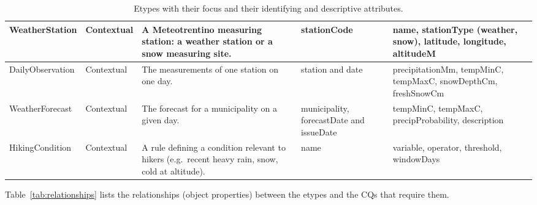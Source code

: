 \begin{table}[htbp]
\begin{tabular}{|>{\raggedright\arraybackslash}p{2.5cm}|>{\raggedright\arraybackslash}p{1.6cm}|>{\raggedright\arraybackslash}p{3.9cm}|>{\raggedright\arraybackslash}p{2.9cm}|>{\raggedright\arraybackslash}p{4.0cm}|}
WeatherStation & Contextual & A Meteotrentino measuring station: a weather station or a snow measuring site. & stationCode & name, stationType (weather, snow), latitude, longitude, altitudeM \\ \hline
DailyObservation & Contextual & The measurements of one station on one day. & station and date & precipitationMm, tempMinC, tempMaxC, snowDepthCm, freshSnowCm \\ \hline
WeatherForecast & Contextual & The forecast for a municipality on a given day. & municipality, forecastDate and issueDate & tempMinC, tempMaxC, precipProbability, description \\ \hline
HikingCondition & Contextual & A rule defining a condition relevant to hikers (e.g.\ recent heavy rain, snow, cold at altitude). & name & variable, operator, threshold, windowDays \\ \hline
\end{tabular}
\caption{Etypes with their focus and their identifying and descriptive attributes.}
\label{tab:etypes}
\end{table}

\noindent Table~\ref{tab:relationships} lists the relationships (object properties) between the etypes and the CQs that require them.

